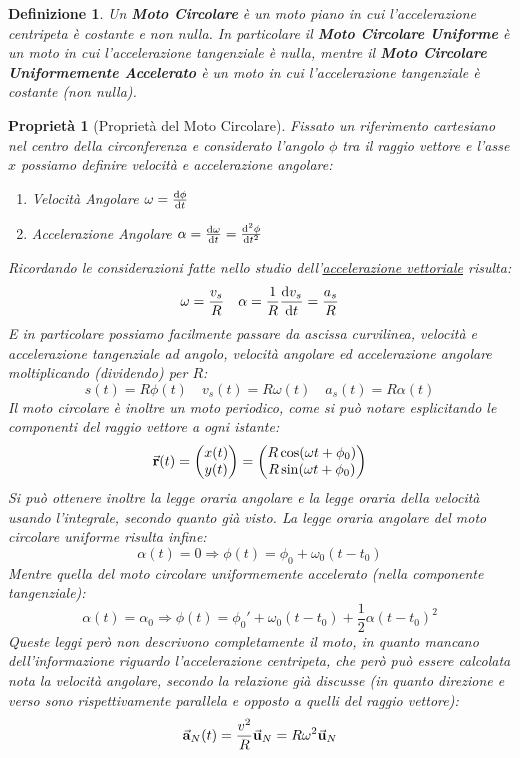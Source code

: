 \documentclass{article}
\newtheorem{property}{Proprietà}[section]
\newtheorem{defn}{Definizione}[section]
\newcommand{\R}{\mathbb{R}}
\newcommand{\then}{\ensuremath{\Rightarrow}}
\renewcommand{\a}{\va{a}}
\renewcommand{\u}{\va{u}}
\renewcommand{\r}{\va{r}}
\begin{document}
\begin{defn}
Un \textbf{Moto Circolare} è un moto piano in cui l'accelerazione centripeta è costante e non nulla.
In particolare il \textbf{Moto Circolare Uniforme} è un moto in cui l'accelerazione tangenziale è nulla, mentre il \textbf{Moto Circolare Uniformemente Accelerato} è un moto in cui l'accelerazione tangenziale è costante (non nulla).
\end{defn}
\begin{property}[Proprietà del Moto Circolare]
Fissato un riferimento cartesiano nel centro della circonferenza e considerato l'angolo $\phi$ tra il raggio vettore e l'asse $x$ possiamo definire velocità e accelerazione angolare:
\begin{enumerate}
    \item Velocità Angolare $\omega=\dv{\phi}{t}$
    \item Accelerazione Angolare $\alpha=\dv{\omega}{t}=\dv[2]{\phi}{t}$
\end{enumerate}
Ricordando le considerazioni fatte nello studio dell'\hyperlink{velangolare}{accelerazione vettoriale} risulta:
\[\omega=\frac{v_s}{R}\quad\alpha=\frac{1}{R}\dv{v_s}{t}=\frac{a_s}{R}\]
E in particolare possiamo facilmente passare da ascissa curvilinea, velocità e accelerazione tangenziale ad angolo, velocità angolare ed accelerazione angolare moltiplicando (dividendo) per $R$:
\[s(t)=R\phi(t)\quad v_s(t)=R\omega(t)\quad a_s(t)=R\alpha(t)\]
Il moto circolare è inoltre un moto periodico, come si può notare esplicitando le componenti del raggio vettore a ogni istante:
\[\r(t)=\begin{pmatrix}x(t)\\y(t)\end{pmatrix}=\begin{pmatrix}R\cos(\omega t+\phi_0)\\R\sin(\omega t+\phi_0)\end{pmatrix}\]
Si può ottenere inoltre la legge oraria angolare e la legge oraria della velocità usando l'integrale, secondo quanto già visto.
La legge oraria angolare del moto circolare uniforme risulta infine:
\[\alpha(t)=0\then \phi(t)=\phi_0+\omega_0(t-t_0)\]
Mentre quella del moto circolare uniformemente accelerato (nella componente tangenziale):
\[\alpha(t)=\alpha_0\then\phi(t)=\phi_0'+\omega_0(t-t_0)+\frac{1}{2}\alpha (t-t_0)^2\]
Queste leggi però non descrivono completamente il moto, in quanto mancano dell'informazione riguardo l'accelerazione centripeta, che però può essere calcolata nota la velocità angolare, secondo la relazione già discusse (in quanto direzione e verso sono rispettivamente parallela e opposto a quelli del raggio vettore):
\[\a_N(t)=\frac{v^2}{R}\u_N=R\omega^2\u_N\]
\end{property}
\end{document}
